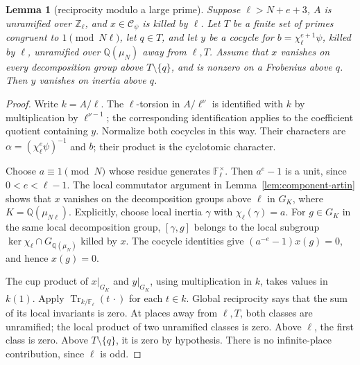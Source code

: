 \documentclass[11pt,a4paper]{article}
\newtheorem{lemma}[theorem]{Lemma}
\theoremstyle{definition}
\newcommand{\Q}{\mathbb Q}
\newcommand{\Z}{\mathbb Z}
\newcommand{\F}{\mathbb F}
\begin{document}
\begin{lemma}[reciprocity modulo a large prime]\label{lem:large-reciprocity}
Suppose \(\ell>N+e+3\), \(A\) is unramified over \(\Z_\ell\),
and \(x\in\mathcal C_\psi\) is killed by \(\ell\).
Let \(T\) be a finite set of primes congruent to \(1\pmod{N\ell}\),
let \(q\in T\), and let \(y\) be a cocycle for
\(b=\chi_\ell^{e+1}\psi\), killed by \(\ell\),
unramified over \(\Q(\mu_N)\) away from \(\ell,T\).
Assume that \(x\) vanishes on every decomposition group above
\(T\setminus\{q\}\), and is nonzero on a Frobenius above \(q\).
Then \(y\) vanishes on inertia above \(q\).
\end{lemma}
\begin{proof}
Write \(k=A/\ell\).
The \(\ell\)-torsion in \(A/\ell^\nu\) is identified with \(k\)
by multiplication by \(\ell^{\nu-1}\); the corresponding identification
applies to the coefficient quotient containing \(y\).
Normalize both cocycles in this way.
Their characters are
\(\alpha=(\chi_\ell^e\psi)^{-1}\) and \(b\);
their product is the cyclotomic character.

Choose \(a\equiv1\pmod N\) whose residue generates
\(\F_\ell^\times\).
Then \(a^e-1\) is a unit, since \(0<e<\ell-1\).
The local commutator argument in
Lemma~\ref{lem:component-artin} shows that \(x\) vanishes
on the decomposition groups above \(\ell\) in
\(G_K\), where \(K=\Q(\mu_{N\ell})\).
Explicitly, choose local inertia \(\gamma\) with
\(\chi_\ell(\gamma)=a\).
For \(g\in G_K\) in the same local decomposition group,
\([\gamma,g]\) belongs to the local subgroup
\(\ker\chi_\ell\cap G_{\Q(\mu_N)}\) killed by \(x\).
The cocycle identities give
\((a^{-e}-1)x(g)=0\), and hence \(x(g)=0\).

The cup product of \(x|_{G_K}\) and \(y|_{G_K}\), using
multiplication in \(k\), takes values in \(k(1)\).
Apply \(\operatorname{Tr}_{k/\F_\ell}(t\,\cdot)\) for each \(t\in k\).
Global reciprocity says that the sum of its local invariants is zero.
At places away from \(\ell,T\), both classes are unramified;
the local product of two unramified classes is zero.
Above \(\ell\), the first class is zero.
Above \(T\setminus\{q\}\), it is zero by hypothesis.
There is no infinite-place contribution, since \(\ell\) is odd.


\end{proof}
\end{document}
